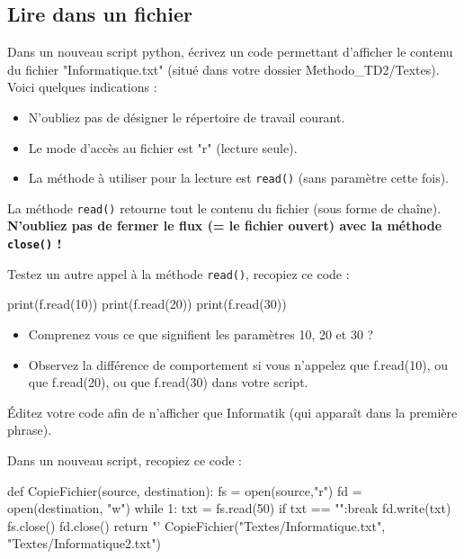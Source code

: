 \subsection{Lire dans un fichier}

\exer

 Dans un nouveau script python, écrivez un code permettant d'afficher le contenu du fichier "Informatique.txt" (situé dans votre dossier Methodo\_TD2/Textes). Voici quelques indications :

\begin{itemize}
\item N'oubliez pas de désigner le répertoire de travail courant.
\item Le mode d'accès au fichier est "r" (lecture seule).
\item La méthode à utiliser pour la lecture est \texttt{read()} (sans paramètre cette fois).
\end{itemize}

 La méthode \texttt{read()} retourne tout le contenu du fichier (sous forme de chaîne). \textbf{N'oubliez pas de fermer le flux (= le fichier ouvert) avec la méthode \texttt{close()} !}

 Testez un autre appel à la méthode \texttt{read()}, recopiez ce code :
\begin{python}
print(f.read(10))
print(f.read(20))
print(f.read(30))
\end{python}

\begin{itemize}
\item Comprenez vous ce que signifient les paramètres 10, 20 et 30 ?
\item Observez la différence de comportement si vous n'appelez que f.read(10), ou que f.read(20), ou que f.read(30) dans votre script.
\end{itemize}
 Éditez votre code afin de n'afficher que Informatik (qui apparaît dans la
première phrase).

\newpage
\exer

 Dans un nouveau script, recopiez ce code :
\begin{python}
def CopieFichier(source, destination):
  fs = open(source,"r")
  fd = open(destination, "w")
  while 1:
    txt = fs.read(50)
    if txt == "":break
    fd.write(txt)
  fs.close()
  fd.close()
  return "'%
CopieFichier("Textes/Informatique.txt", "Textes/Informatique2.txt")

\end{python}

